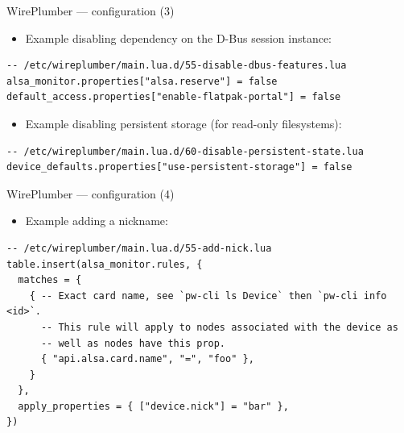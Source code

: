 \begin{frame}[fragile]{WirePlumber — configuration (3)}
  \begin{itemize}
  \item Example disabling dependency on the D-Bus session instance:
  \end{itemize}

    \begin{block}{}
      \fontsize{11}{11}\selectfont
        \begin{verbatim}
-- /etc/wireplumber/main.lua.d/55-disable-dbus-features.lua
alsa_monitor.properties["alsa.reserve"] = false
default_access.properties["enable-flatpak-portal"] = false
          \end{verbatim}
        \end{block}

  \begin{itemize}
  \item Example disabling persistent storage (for read-only filesystems):
  \end{itemize}

    \begin{block}{}
      \fontsize{11}{11}\selectfont
        \begin{verbatim}
-- /etc/wireplumber/main.lua.d/60-disable-persistent-state.lua
device_defaults.properties["use-persistent-storage"] = false
          \end{verbatim}
        \end{block}

\end{frame}



\begin{frame}[fragile]{WirePlumber — configuration (4)}

  \begin{itemize}
  \item Example adding a nickname:
  \end{itemize}

    \begin{block}{}
      \fontsize{10.5}{10.5}\selectfont
        \begin{verbatim}
-- /etc/wireplumber/main.lua.d/55-add-nick.lua
table.insert(alsa_monitor.rules, {
  matches = {
    { -- Exact card name, see `pw-cli ls Device` then `pw-cli info <id>`.
      -- This rule will apply to nodes associated with the device as
      -- well as nodes have this prop.
      { "api.alsa.card.name", "=", "foo" },
    }
  },
  apply_properties = { ["device.nick"] = "bar" },
})
        \end{verbatim}
      \end{block}

\end{frame}



